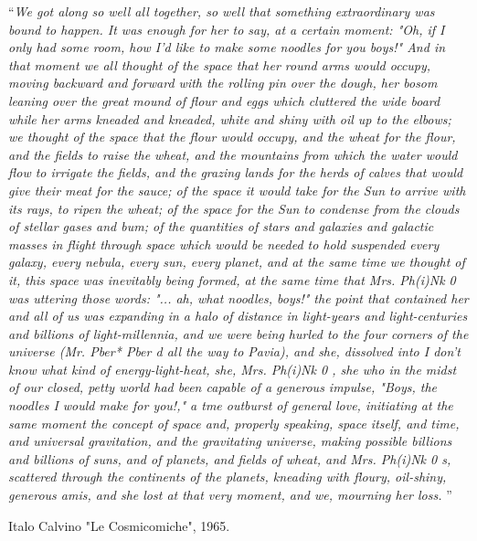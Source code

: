 \begin{acknowledgements}
{\enquote{\itshape We got along so well all together, so well that something extraordinary was bound 
to happen. It was enough for her to say, at a certain moment: "Oh, if I only had some 
room, how I'd like to make some noodles for you boys!" And in that moment we all 
thought of the space that her round arms would occupy, moving backward and forward 
with the rolling pin over the dough, her bosom leaning over the great mound of flour and 
eggs which cluttered the wide board while her arms kneaded and kneaded, white and 
shiny with oil up to the elbows; we thought of the space that the flour would occupy, and 
the wheat for the flour, and the fields to raise the wheat, and the mountains from which 
the water would flow to irrigate the fields, and the grazing lands for the herds of calves 
that would give their meat for the sauce; of the space it would take for the Sun to arrive 
with its rays, to ripen the wheat; of the space for the Sun to condense from the clouds of 
stellar gases and bum; of the quantities of stars and galaxies and galactic masses in flight 
through space which would be needed to hold suspended every galaxy, every nebula, 
every sun, every planet, and at the same time we thought of it, this space was inevitably 
being formed, at the same time that Mrs. Ph(i)Nk 0 was uttering those words: "... ah, 
what noodles, boys!" the point that contained her and all of us was expanding in a halo of 
distance in light-years and light-centuries and billions of light-millennia, and we were 
being hurled to the four corners of the universe (Mr. Pber* Pber d all the way to Pavia), and 
she, dissolved into I don't know what kind of energy-light-heat, she, Mrs. Ph(i)Nk 0 , she 
who in the midst of our closed, petty world had been capable of a generous impulse, 
"Boys, the noodles I would make for you!," a tme outburst of general love, initiating at 
the same moment the concept of space and, properly speaking, space itself, and time, and 
universal gravitation, and the gravitating universe, making possible billions and billions 
of suns, and of planets, and fields of wheat, and Mrs. Ph(i)Nk 0 s, scattered through the 
continents of the planets, kneading with floury, oil-shiny, generous amis, and she lost at 
that very moment, and we, mourning her loss.  }\bigbreak
}

\hfill Italo Calvino "Le Cosmicomiche", 1965.
\end{acknowledgements}